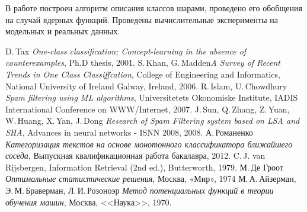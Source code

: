 ﻿\documentclass[12pt,a4paper]{amsart}
\begin{document}
	В работе построен алгоритм описания классов шарами, проведено его обобщения на случай ядерных функций. Проведены вычислительные эксперименты на модельных и реальных данных.


\begin{thebibliography}{99}
	 D.\,Tax  \textit{One-class classification; Concept-learning in the absence of
	counterexamples}, Ph.D thesis, 2001.
	 S.\,Khan, G.\,Madden\textit{A Survey of Recent Trends in One Class
	Classiffcation}, College of Engineering and Informatics, National University of Ireland Galway,
	Ireland, 2006.
	 R.\,Islam, U.\,Chowdhury \textit{Spam filtering using ML algorithms}, Universitetets Okonomiske Institute, IADIS International Conference on WWW/Internet, 2007.
	 J.\,Sun, Q.\,Zhang, Z.\,Yuan, W.\,Huang, X.\,Yan, J.\,Dong \textit{Research of Spam Filtering system based on LSA and SHA}, Advances in neural networks - ISNN 2008, 2008.
	 А.\,Романенко  \textit{Категоризация текстов на основе монотонного
	классификатора ближайшего соседа}, Выпускная квалификационная работа бакалавра, 2012.
	 C.\,J. van Rijsbergen, Information Retrieval (2nd ed.), Butterworth, 1979.
	М.\,Де Гроот \textit{Оптимальные статистические решения}, Москва, «Мир», 1974
	 М.\,А.\,Айзерман, Э.\,М.\,Браверман, Л.\,И.\,Розоноэр \textit{Метод потенциальных функций в теории обучения машин}, Москва, <<Наука>>, 1970.
\end{thebibliography}
\end{document}
